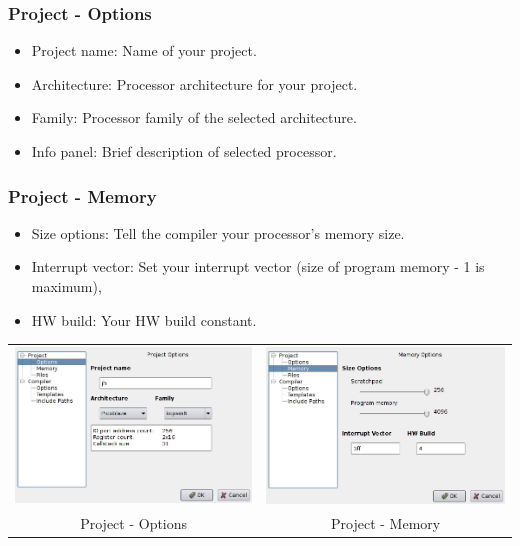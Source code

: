    \subsubsection{Project - Options}
        \begin{itemize}
            \item Project name: Name of your project.
            \item Architecture: Processor architecture for your project.
            \item Family: Processor family of the selected architecture.
            \item Info panel: Brief description of selected processor.
        \end{itemize}

        \subsubsection{Project - Memory}
            \begin{itemize}
                \item Size options: Tell the compiler your processor's memory size.
                \item Interrupt vector: Set your interrupt vector (size of program memory - 1 is maximum),
                \item HW build: Your HW build constant.
            \end{itemize}

        \begin{table}[h!]
            \begin{tabular}{cc}
                \includegraphics[width=.5\textwidth]{img/config2.png}
                    &
                \includegraphics[width=.5\textwidth]{img/config1.png}
                    \\
                Project - Options & Project - Memory
            \end{tabular}
        \end{table}

